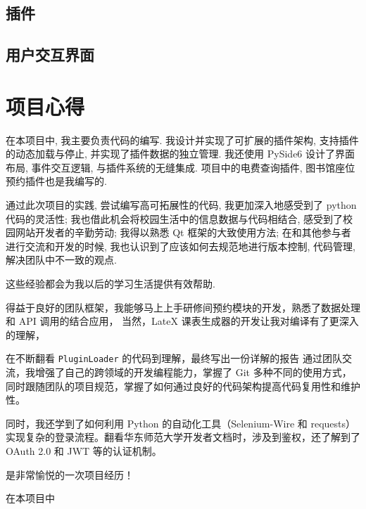 \documentclass[14pt,a4paper,UTF8,twoside]{article}
\begin{document}
    \subsection{插件}\label{subsec:plugins}
    
    
    
    

    \subsection{用户交互界面}\label{subsec:gui}
    

    \section{项目心得}\label{sec:thoughts}

    \begin{Thought}[关卓谦]
        在本项目中, 我主要负责代码的编写.
        我设计并实现了可扩展的插件架构, 支持插件的动态加载与停止, 并实现了插件数据的独立管理.
        我还使用 PySide6 设计了界面布局, 事件交互逻辑, 与插件系统的无缝集成.
        项目中的电费查询插件, 图书馆座位预约插件也是我编写的.

        通过此次项目的实践, 尝试编写高可拓展性的代码, 我更加深入地感受到了 python 代码的灵活性;
        我也借此机会将校园生活中的信息数据与代码相结合, 感受到了校园网站开发者的辛勤劳动;
        我得以熟悉 Qt 框架的大致使用方法;
        在和其他参与者进行交流和开发的时候, 我也认识到了应该如何去规范地进行版本控制, 代码管理, 解决团队中不一致的观点.

        这些经验都会为我以后的学习生活提供有效帮助.
    \end{Thought}

    \begin{Thought}[张梓卫]
        得益于良好的团队框架，我能够马上上手研修间预约模块的开发，熟悉了数据处理和 API 调用的结合应用，
        当然，LateX 课表生成器的开发让我对编译有了更深入的理解，

        \vspace{0.3cm}

        在不断翻看 \verb`PluginLoader` 的代码到理解，最终写出一份详解的报告
        通过团队交流，我增强了自己的跨领域的开发编程能力，掌握了 Git 多种不同的使用方式，
        同时跟随团队的项目规范，掌握了如何通过良好的代码架构提高代码复用性和维护性。

        \vspace{0.3cm}

        同时，我还学到了如何利用 Python 的自动化工具（Selenium-Wire 和 requests）
        实现复杂的登录流程。翻看华东师范大学开发者文档时，涉及到鉴权，还了解到了 OAuth 2.0 和 JWT 等的认证机制。

        \vspace{0.3cm}

        是非常愉悦的一次项目经历！
    \end{Thought}

    \begin{Thought}[王文锦]
        在本项目中
    \end{Thought}
\end{document}
